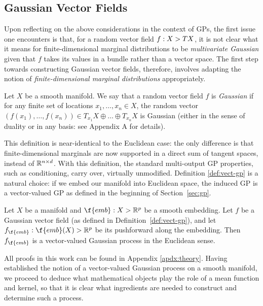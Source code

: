 \subsection{Gaussian Vector Fields}
\label{sec:vv-manifold-gp}

Upon reflecting on the above considerations in the context of GPs, the first issue one encounters is that, for a random vector field $f : X \-> TX$, it is not clear what it means for finite-dimensional marginal distributions to be \emph{multivariate Gaussian} given that $f$ takes its values in a bundle rather than a vector space.
The first step towards constructing Gaussian vector fields, therefore, involves adapting the notion of \emph{finite-dimensional marginal distributions} appropriately.

\begin{definition}
	\label{def:vect-gp}
	Let $X$ be a smooth manifold.
	We say that a random vector field $f$ is \emph{Gaussian} if for any finite set of locations $x_1, \ldots, x_n \in X$, the random vector $(f(x_1),\ldots,f(x_n)) \in T_{x_1}X \oplus \ldots \oplus T_{x_n}X$ is Gaussian (either in the sense of duality or in any basis: see Appendix A for details).
\end{definition}

This definition is near-identical to the Euclidean case: the only difference is that finite-dimensional marginals are now supported in a direct sum of tangent spaces, instead of $\mathbb{R}^{n \times d}$.
With this definition, the standard multi-output GP properties, such as conditioning, carry over, virtually unmodified.
Definition \ref{def:vect-gp} is a natural choice: if we embed our manifold into Euclidean space, the induced GP is a vector-valued GP as defined in the beginning of Section~\ref{sec:gp}.

\begin{proposition} \label{prop:embedding}
	Let $X$ be a manifold and $\f{emb} : X \-> \R^p$ be a smooth embedding.
	Let $f$ be a Gaussian vector field (as defined in Definition~\ref{def:vect-gp}), and let $f_{\f{emb}} : \f{emb}(X) \-> \R^p$ be its pushforward along the embedding.
	Then $f_{\f{emb}}$ is a vector-valued Gaussian process in the Euclidean sense.
\end{proposition}

All proofs in this work can be found in Appendix \ref{apdx:theory}.
Having established the notion of a vector-valued Gaussian process on a smooth manifold, we proceed to deduce what mathematical objects play the role of a mean function and kernel, so that it is clear what ingredients are needed to construct and determine such a process.

